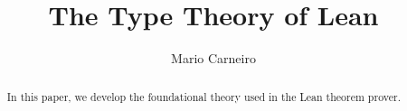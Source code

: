 \documentclass{llncs}
\begin{document}
\title{The Type Theory of Lean}
%
%
\author{Mario Carneiro}
%
%
%

\maketitle              %

\begin{abstract}
In this paper, we develop the foundational theory used in the Lean theorem prover.
\end{abstract}
%
%




%
%
%
\end{document}
